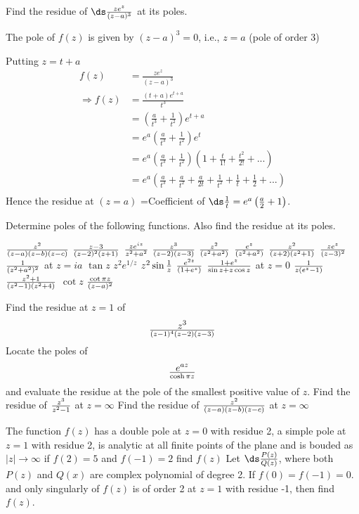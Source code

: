 \begin{example}
Find the residue of $\ds \frac{ze^z}{(z-a)^3}$ at its poles.
\end{example}
\begin{solution}
The pole of $f(z)$ is given by $(z-a)^3 = 0$, i.e., $z=a$ (pole of order 3)

\noindent
Putting $z = t+a$
\begin{align*}
f(z) &= \frac{ze^z}{(z-a)^3} \\
\Rightarrow f(z) &=\frac{(t+a)e^{t+a}}{t^3} \\
&=\left(\frac{a}{t^3} + \frac{1}{t^2}\right)e^{t+a} \\
&=e^a \left(\frac{a}{t^3} + \frac{1}{t^2}\right)e^{t} \\
&=e^a \left(\frac{a}{t^3} + \frac{1}{t^2}\right)\left(1+\frac{t}{1!} + \frac{t^2}{2!} + ...\right) \\
&=e^a \left(\frac{a}{t^3} + \frac{a}{t^2} + \frac{a}{2t} + \frac{1}{t^2} + \frac{1}{t} + \frac{1}{2} + ... \right) \\
\end{align*}
Hence the residue at $(z=a)$ =Coefficient of $\ds \frac{1}{t} = e^a\left(\frac{a}{2}+1\right)$.
\end{solution}

	\begin{problems}		

		
     	\prob  Determine poles of the following functions. Also find the residue at its poles.
           	
           	\subprob  $z^2 \over (z-a)(z-b)(z-c)$
           	\subprob  $z-3 \over (z-2)^2 (z+1)$
           	\subprob  $ze^{iz} \over z^2 + a^2$
           	\subprob  $z^3 \over (z-2)(z-3)$
           	\subprob  $z^2 \over (z^2 + a^2)$
           	\subprob  $e^z \over (z^2 + a^2)$
           	\subprob  $z^2 \over (z+2)(z^2+1)$
           	\subprob  $ze^z \over (z-3)^2$
           	\subprob  $1 \over (z^2+a^2)^2$ at $z=ia$
           	\subprob  $\tan z$
           	\subprob  $z^2 e^{1/z}$
           	\subprob  $z^2 \sin {1 \over z}$
           	\subprob  $e^{2z} \over (1+e^z)$
           	\subprob  $1+e^z \over \sin z + z \cos z$ at $z=0$
           	\subprob  $1 \over z(e^z-1)$
           	\subprob  $z^2 +1 \over (z^2-1)(z^2+4)$
           	\subprob  $\cot z$
           	\subprob  $\cot \pi z \over (z-a)^2$
          
		\prob  Find the residue at $z=1$ of \[z^3 \over (z-1)^4(z-2)(z-3)\]
		\prob  Locate the poles of \[e^{az} \over \cosh \pi z\] and evaluate the residue at the pole of the smallest positive value of $z$.
		\prob  Find the residue of $z^3 \over z^2-1$ at $z=\infty$
		\prob  Find the residue of $z^2 \over (z-a)(z-b)(z-c)$ at ${z=\infty}$
	
	\prob  The function $f(z)$ has a double pole at $z=0$ with residue 2, a simple pole at $z=1$ with residue 2, is analytic at all finite points of the plane and is bouded as $|z|\rightarrow \infty$ if $f(2)=5$ and $f(-1)=2$ find $f(z)$						
\prob Let $\ds \frac{P(z)}{Q(z)}$, where both $P(z)$ and $Q(x)$ are complex polynomial
of degree 2. If $f(0) = f(-1) = 0$. and only singularly of $f(z)$ is of order 2 at $z =1$ with residue -1, then find $f(z)$.	
\end{problems}


